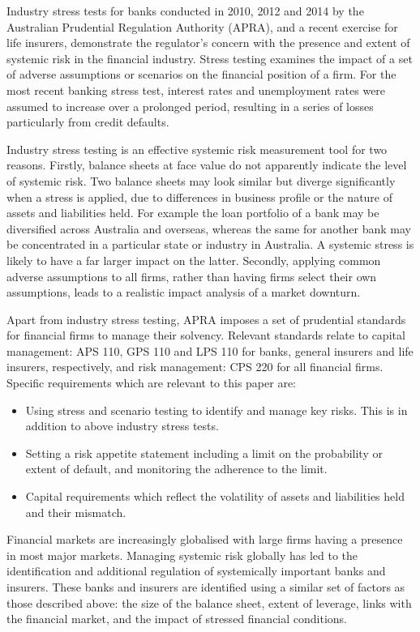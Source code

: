 \documentclass[authoryear]{elsarticle}
\newcommand{\bi}{\begin{itemize}}
\renewcommand{\i}{\item}
\newcommand{\ei}{\end{itemize}}
\begin{document}
Industry stress tests for banks conducted in 2010, 2012 and 2014 by the Australian Prudential Regulation Authority (APRA), and a recent exercise for life insurers, demonstrate the regulator's concern with the presence and extent of systemic risk in the financial industry. Stress testing examines the impact of a set of adverse assumptions or scenarios on the financial position of a firm. For the most recent banking stress test, interest rates and unemployment rates were assumed to increase over a prolonged period, resulting in a series of losses particularly from credit defaults.


Industry stress testing is an effective systemic risk measurement tool for two reasons. Firstly, balance sheets at face value do not apparently indicate the level of systemic risk. Two balance sheets may look similar but diverge significantly when a stress is applied, due to differences in business profile or the nature of assets and liabilities held. For example the loan portfolio of a bank may be diversified across Australia and overseas, whereas the same for another bank may be concentrated in a particular state or industry in Australia. A systemic stress is likely to have a far larger impact on the latter. Secondly, applying common adverse assumptions to all firms, rather than having firms select their own assumptions, leads to a realistic impact analysis of a market downturn.


Apart from industry stress testing, APRA imposes a set of prudential standards for financial firms to manage their solvency. Relevant standards relate to capital management: APS 110, GPS 110 and LPS 110 for banks, general insurers and life insurers, respectively, and risk management: CPS 220 for all financial firms. Specific requirements which are relevant to this paper are:
\bi

\i Using stress and scenario testing to identify and manage key risks. This is in addition to above industry stress tests.

\i Setting a risk appetite statement including a limit on the probability or extent of default, and monitoring the adherence to the limit.

\i Capital requirements which reflect the volatility of assets and liabilities held and their mismatch.

\ei

Financial markets are increasingly globalised with large firms having a presence in most major markets. Managing systemic risk globally has led to the identification and additional regulation of systemically important banks and insurers. These banks and insurers are identified using a similar set of  factors as those described above: the size of the balance sheet, extent of leverage, links with the financial market, and the impact of stressed financial conditions.
\end{document}
